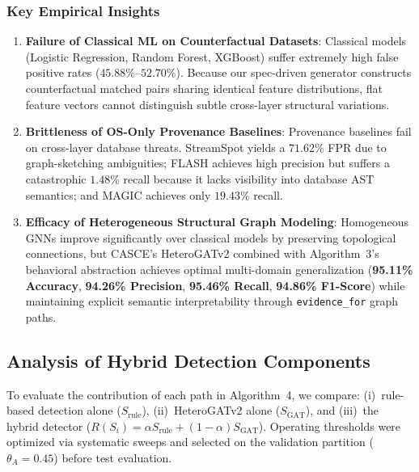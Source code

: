 \documentclass[conference]{IEEEtran}
\begin{document}
\subsubsection{Key Empirical Insights}
\begin{enumerate}[leftmargin=*,itemsep=1pt,topsep=2pt]
\item \textbf{Failure of Classical ML on Counterfactual Datasets}: Classical models (Logistic Regression, Random Forest, XGBoost) suffer extremely high false positive rates ($45.88\%$--$52.70\%$). Because our spec-driven generator constructs counterfactual matched pairs sharing identical feature distributions, flat feature vectors cannot distinguish subtle cross-layer structural variations.
\item \textbf{Brittleness of OS-Only Provenance Baselines}: Provenance baselines fail on cross-layer database threats. StreamSpot yields a $71.62\%$ FPR due to graph-sketching ambiguities; FLASH achieves high precision but suffers a catastrophic $1.48\%$ recall because it lacks visibility into database AST semantics; and MAGIC achieves only $19.43\%$ recall.
\item \textbf{Efficacy of Heterogeneous Structural Graph Modeling}: Homogeneous GNNs improve significantly over classical models by preserving topological connections, but CASCE's HeteroGATv2 combined with Algorithm~3's behavioral abstraction achieves optimal multi-domain generalization (\textbf{95.11\% Accuracy}, \textbf{94.26\% Precision}, \textbf{95.46\% Recall}, \textbf{94.86\% F1-Score}) while maintaining explicit semantic interpretability through \texttt{evidence\_for} graph paths.
\end{enumerate}

\subsection{Analysis of Hybrid Detection Components}
\label{subsec:rules_gat_hybrid}

To evaluate the contribution of each path in Algorithm~4, we compare: (i)~rule-based detection alone ($S_{\mathrm{rule}}$), (ii)~HeteroGATv2 alone ($S_{\mathrm{GAT}}$), and (iii)~the hybrid detector ($R(S_i) = \alpha S_{\mathrm{rule}} + (1-\alpha) S_{\mathrm{GAT}}$). Operating thresholds were optimized via systematic sweeps and selected on the validation partition ($\theta_A = 0.45$) before test evaluation.
\end{document}

